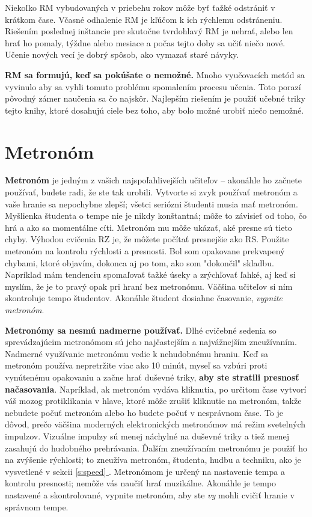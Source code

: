 \documentclass[11pt,a4paper]{book}
\newcommand*{\fullref}[1]{\hyperref[{#1}]{\ref*{#1} \nameref*{#1}}} %
\begin{document}
Niekoľko RM vybudovaných v priebehu rokov môže byť ťažké odstrániť v krátkom čase. Včasné odhalenie RM je kľúčom k ich rýchlemu odstráneniu. Riešením poslednej inštancie pre skutočne tvrdohlavý RM je nehrať, alebo len hrať ho pomaly, týždne alebo mesiace a počas tejto doby sa učiť niečo nové. Učenie nových vecí je dobrý spôsob, ako vymazať staré návyky.

\textbf{RM sa formujú, keď sa pokúšate o nemožné.} Mnoho vyučovacích metód sa vyvinulo aby sa vyhli tomuto problému spomalením procesu učenia. Toto porazí pôvodný zámer naučenia sa čo najskôr. Najlepším riešením je použiť učebné triky tejto knihy, ktoré dosahujú ciele bez toho, aby bolo možné urobiť niečo nemožné.

\section{Metronóm}\label{s:metronome}
\textbf{Metronóm} je jedným z vašich najspoľahlivejších učiteľov – akonáhle ho začnete používať, budete radi, že ste tak urobili. Vytvorte si zvyk používať metronóm a vaše hranie sa nepochybne zlepší; všetci seriózni študenti musia mať metronóm. Myšlienka študenta o tempe nie je nikdy konštantná; môže to závisieť od toho, čo hrá a ako sa momentálne cíti. Metronóm mu môže ukázať, aké presne sú tieto chyby. Výhodou cvičenia RZ je, že môžete počítať presnejšie ako RS. Použite metronóm na kontrolu rýchlosti a presnosti. Bol som opakovane prekvapený chybami, ktoré objavím, dokonca aj po tom, ako som "dokončil" skladbu. Napríklad mám tendenciu spomaľovať ťažké úseky a zrýchľovať ľahké, aj keď si myslím, že je to pravý opak pri hraní bez metronómu. Väčšina učiteľov si ním skontroluje tempo študentov. Akonáhle študent dosiahne časovanie, \emph{vypnite metronóm}.

\textbf{Metronómy sa nesmú nadmerne používať.} Dlhé cvičebné sedenia so sprevádzajúcim metronómom sú jeho najčastejším a najvážnejším zneužívaním. Nadmerné využívanie metronómu vedie k nehudobnému hraniu. Keď sa metronóm používa nepretržite viac ako 10 minút, myseľ sa vzbúri proti vynútenému opakovaniu a začne hrať duševné triky, \textbf{aby ste stratili presnosť načasovania}. Napríklad, ak metronóm vydáva kliknutia, po určitom čase vytvorí váš mozog protiklikania v hlave, ktoré môže zrušiť kliknutie na metronóm, takže nebudete počuť metronóm alebo ho budete počuť v nesprávnom čase. To je dôvod, prečo väčšina moderných elektronických metronómov má režim svetelných impulzov. Vizuálne impulzy sú menej náchylné na duševné triky a tiež menej zasahujú do hudobného prehrávania. Ďalším zneužívaním metronómu je použiť ho na zvýšenie rýchlosti; to zneužíva metronóm, študenta, hudbu a techniku, ako je vysvetlené v sekcii \fullref{s:speed}. Metronómom je určený na nastavenie tempa a kontrolu presnosti; nemôže vás naučiť hrať muzikálne. Akonáhle je tempo nastavené a skontrolované, vypnite metronóm, aby ste \emph{vy} mohli cvičiť hranie v správnom tempe.
\end{document}
